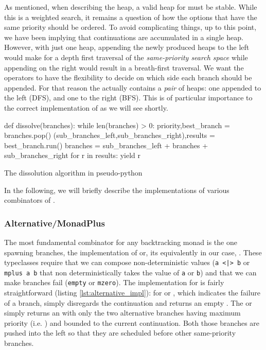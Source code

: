 As mentioned, when describing the heap, a valid heap for 
must be stable. While this is a weighted search, it remains a question
of how the options that have the same priority should be ordered.  To
avoid complicating things, up to this point, we have been implying that
continuations are accumulated in a single heap. However, with just one
heap, appending the newly produced heaps to the left would make for a
depth first traversal of the \emph{same-priority search space} while
appending on the right would result in a breath-first traversal. We
want the operators to have the flexibility to decide on which side
each branch should be appended. For that reason the 
actually contains a \emph{pair} of heaps: one appended to the left (DFS), and one
to the right (BFS). This is of particular importance to the correct
implementation of \hask{<//>} as we will see shortly.

\begin{code}
\begin{pycode}
def dissolve(branches):
    while len(branches) > 0:
        priority,best_branch = branches.pop()
        (sub_branches_left,sub_branches_right),results = best_branch.run()
        branches = sub_branches_left + branches + sub_branches_right
        for r in results:
            yield r
\end{pycode}
  \caption{\label{lst:dissovle_algo}The dissolution algorithm in
    pseudo-python}
\end{code}


In the following, we will briefly describe the implementations of
various combinators of .

\subsubsection{Alternative/MonadPlus}

The most fundamental combinator for any backtracking monad is the one
spawning branches, the implementation of  or, its
equivalently in our case, . These typeclasses require
that we can compose non-deterministic values (\texttt{a <|> b} or
\texttt{mplus a b} that non deterministically takes the value of
\texttt{a} or \texttt{b}) and that we can make branches fail
(\texttt{empty} or \texttt{mzero}). The implementation for
 is fairly straightforward (listing
\ref{lst:alternative_impl}): for  or , which
indicates the failure of a branch, simply disregards the continuation and
returns an empty . The  or \hask{<|>} simply
returns an  with only the two alternative branches having
maximum priority (i.e. ) and bounded to the
current continuation. Both those branches are pushed into the left so
that they are scheduled before other same-priority branches.

